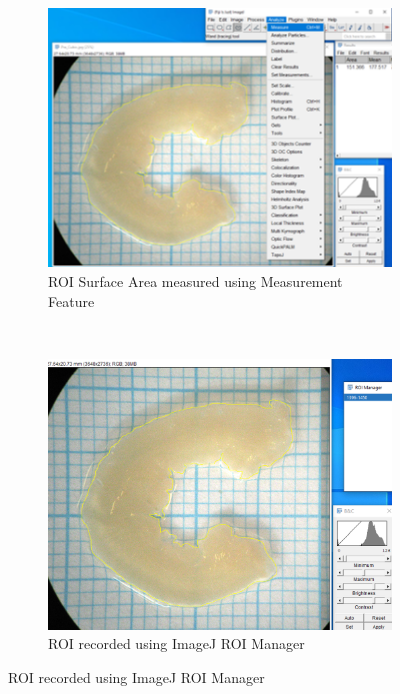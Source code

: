 \begin{figure}[H]
    \medskip
    \begin{subfigure}[t]{.475\textwidth}
    \centering
    \includegraphics[width=\linewidth]{Figures/MeasureProt4.png}
    \caption{ROI Surface Area measured using Measurement Feature}
    \end{subfigure}\hfill
    ~
    \begin{subfigure}[t]{.475\textwidth}
    \centering
    \includegraphics[width=\linewidth]{Figures/MeasureProt3.png}
    \caption{ROI recorded using ImageJ ROI Manager}
    \end{subfigure}\hfill


\end{figure}
